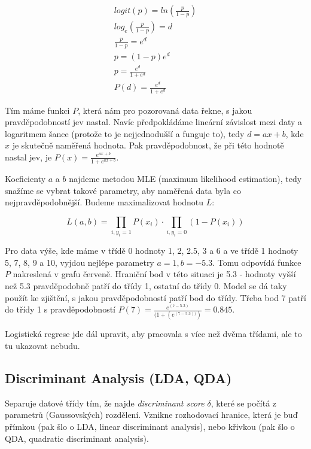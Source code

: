 \begin{equation}
\begin{split}
logit(p)=ln(\frac{p}{1-p})\\
log_e(\frac{p}{1-p}) = d\\
\frac{p}{1-p} = e^d\\
p = (1-p)e^d\\
p = \frac{e^d}{1+e^d}\\
P(d) = \frac{e^d}{1+e^d}
\end{split}
\end{equation}

Tím máme funkci $P$, která nám pro pozorovaná data řekne, s jakou pravděpodobností jev nastal. Navíc předpokládáme lineární závislost mezi daty a logaritmem šance (protože to je nejjednodušší a funguje to), tedy $d = ax + b$, kde $x$ je skutečně naměřená hodnota. Pak pravděpodobnost, že při této hodnotě nastal jev, je $P(x) = \frac{e^{ax+b}}{1+e^{ax+b}}$.

Koeficienty $a$ a $b$ najdeme metodou MLE (maximum likelihood estimation), tedy snažíme se vybrat takové parametry, aby naměřená data byla co nejpravděpodobnější. Budeme maximalizovat hodnotu $L$:

\begin{equation}
L(a, b) = \prod_{i, y_i = 1}P(x_i)\cdot\prod_{i, y_i = 0}(1 - P(x_i))
\end{equation}

Pro data výše, kde máme v třídě 0 hodnoty 1, 2, 2.5, 3 a 6 a ve třídě 1 hodnoty 5, 7, 8, 9 a 10, vyjdou nejlépe parametry $a=1, b=-5.3$. Tomu odpovídá funkce $P$ nakreslená v grafu červeně. Hraniční bod v této situaci je 5.3 - hodnoty vyšší než 5.3 pravděpodobně patří do třídy 1, ostatní do třídy 0. Model se dá taky použít ke zjištění, s jakou pravděpodobností patří bod do třídy. Třeba bod 7 patří do třídy 1 s pravděpodobností $P(7) = \frac{e ^{(7 - 5.3)}}{(1 + (e ^{(7 - 5.3))})} = 0.845$.

Logistická regrese jde dál upravit, aby pracovala s více než dvěma třídami, ale to tu ukazovat nebudu.


\subsection{Discriminant Analysis (LDA, QDA)}

Separuje datové třídy tím, že najde \textit{discriminant score} $\delta$, které se počítá z parametrů (Gaussovských) rozdělení. Vznikne rozhodovací hranice, která je buď přímkou (pak šlo o LDA, linear discriminant analysis), nebo křivkou (pak šlo o QDA, quadratic discriminant analysis).


